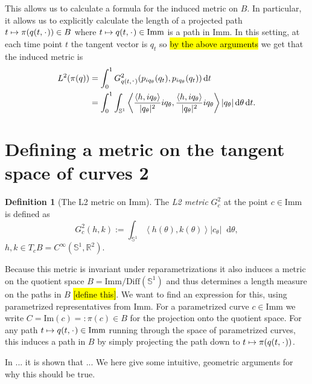 \documentclass[a4,danish]{article}
\theoremstyle{break}
\theoremstyle{definition}
\newtheorem{definition}[subsection]{Definition}
\theoremstyle{Break}
\newcommand{\R}{\mathbb{R}}
\newcommand{\I}{\text{Imm}}
\renewcommand{\S}{\mathbb{S}}
\newcommand{\blank}{\makebox[1ex]{\textbf{$\cdot$}}}
\newcommand*\diff{\mathop{}\!\mathrm{d}}
\begin{document}
This allows us to calculate a formula for
the induced metric on $B$. In particular, it allows us to explicitly calculate
the length of a projected path $t \mapsto \pi(q(t,\blank)) \in B $
where $t \mapsto q(t,\blank) \in \I$ is a path in $\I$.
In this setting, at each time point $t$
the tangent vector is $q_t$ so \hl{by the above arguments} we get that
the induced metric is
\begin{equation*}
  \begin{aligned}
    L^2(\pi(q))& = \int_{0}^{1}
    G^2_{q(t,\blank)}(p_{iq_{\theta}}(q_t),p_{iq_{\theta}}(q_t)) \diff t \\
    & = \int_{0}^{1}
    \int_{\S^1} 
    \left\langle
      \frac{\langle h, iq_{\theta}\rangle}{|q_{\theta}|^2} iq_{\theta},
      \frac{\langle h, iq_{\theta}\rangle}{|q_{\theta}|^2} iq_{\theta}
  \right\rangle | q_{\theta}|\diff \theta \diff t.
  \end{aligned}
\end{equation*}


\section*{Defining a metric on the tangent space of curves 2}
\label{sec:defin-metr-tang-2}



\begin{definition}[The L2 metric on $\I$]
  The \textit{L2 metric} $G^2_c$ at the point $c \in \I$ is defined as
  \begin{equation*}
    G^2_c(h,k) := \int_{\S^{1}} \left\langle{h(\theta)
    , k(\theta)}\right\rangle |c_{\theta}| \diff \theta,
  \end{equation*}
  $h,k \in T_cB = C^{\infty}(\S^1,\R^2)$.
\end{definition}

Because this metric is invariant under reparametrizations it also induces a metric
on the quotient space $B = \I/\text{Diff}(\S^1)$ and thus 
determines a length measure on the paths in $B$
\hl{[define this]}. We want to find an expression for this, using
parametrized representatives from $\I$. For a parametrized curve $c
\in \I$ we write $C = \text{Im}(c) =: \pi(c) \in B$ for the projection
onto the quotient space. For any path $t \mapsto q(t, \blank) \in
\I$ running through the space of parametrized curves, this induces
a path in $B$ by simply projecting the path down to $t \mapsto \pi(q(t,
\blank))$. 

In ... it is shown that ... We here give some intuitive, geometric
arguments for why this should be true.
\end{document}
